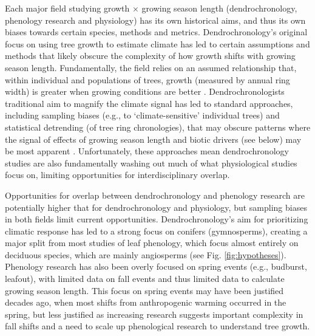 \documentclass[11pt]{article}
\begin{document}
Each major field studying growth $\times$ growing season length (dendrochronology, phenology research and physiology) has its own historical aims, and thus its own biases towards certain species, methods and metrics. Dendrochronology's original focus on using tree growth to estimate climate has led to certain assumptions and methods  that likely obscure the complexity of how growth shifts with growing season length. Fundamentally, the field relies on an assumed relationship that, within individual and populations of trees, growth (measured by annual ring width) is greater when growing conditions are better \citep[e.g.,]{cook2013methods}.  Dendrochronologists traditional aim to magnify the climate signal has led to standard approaches, including sampling biases (e.g., to `climate-sensitive' individual trees) and statistical detrending (of tree ring chronologies), that may obscure patterns where the signal of effects of growing season length and biotic drivers (see below) may be most apparent \citep[such as rapid growth phases,][]{manzanedo2019towards}.  %
Unfortunately, these approaches mean dendrochronology studies are also fundamentally washing out much of what physiological studies focus on, limiting opportunities for interdisciplinary overlap. %

Opportunities for overlap between dendrochronology and phenology research are potentially higher that for dendrochronology and physiology, but sampling biases in both fields limit current opportunities. Dendrochronology's aim for prioritizing climatic response has led to a strong focus on conifers (gymnosperms), creating a major split from most studies of leaf phenology, which focus almost entirely on deciduous species, which are mainly angiosperms (see Fig. \ref{fig:hypotheses}). Phenology research has also been overly focused on spring events (e.g., budburst, leafout), with limited data on fall events and thus limited data to calculate growing season length. This focus on spring events may have been justified decades ago, when most shifts from anthropogenic warming occurred in the spring, but less justified as increasing research suggests important complexity in fall shifts \citep{gill2015,zohner2023effect} and a need to scale up phenological research to understand tree growth.
\end{document}
